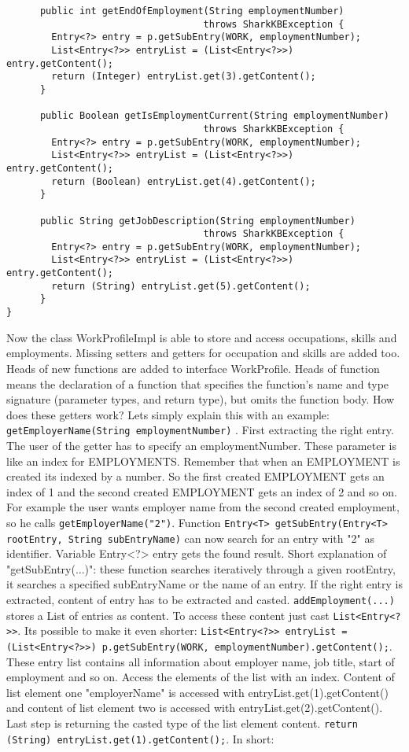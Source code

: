 \documentclass[12pt]{article}
\begin{document}
\begin{verbatim}
      public int getEndOfEmployment(String employmentNumber) 
                                   throws SharkKBException {
        Entry<?> entry = p.getSubEntry(WORK, employmentNumber);
        List<Entry<?>> entryList = (List<Entry<?>>) entry.getContent();
        return (Integer) entryList.get(3).getContent();
      }

      public Boolean getIsEmploymentCurrent(String employmentNumber) 
                                   throws SharkKBException {
        Entry<?> entry = p.getSubEntry(WORK, employmentNumber);
        List<Entry<?>> entryList = (List<Entry<?>>) entry.getContent();
        return (Boolean) entryList.get(4).getContent();
      }

      public String getJobDescription(String employmentNumber) 
                                   throws SharkKBException {
        Entry<?> entry = p.getSubEntry(WORK, employmentNumber);
        List<Entry<?>> entryList = (List<Entry<?>>) entry.getContent();
        return (String) entryList.get(5).getContent();
      }
}

\end{verbatim}
 
Now the class WorkProfileImpl is able to store and access occupations, skills and employments. Missing setters and getters for occupation and skills are added too. Heads of new functions are added to interface WorkProfile. Heads of function means  the declaration of a function that specifies the function's name and type signature (parameter types, and return type), but omits the function body. How does these getters work? Lets simply explain this with an example: {\tt getEmployerName(String employmentNumber)} . First extracting the right entry. The user of the getter has to specify an employmentNumber. These parameter is like an index for EMPLOYMENTS. Remember that when an EMPLOYMENT is created its indexed by a number. So the first created EMPLOYMENT gets an index of 1 and the second created EMPLOYMENT gets an index of 2 and so on. For example the user wants employer name from the second created employment, so he calls {\tt getEmployerName("2")}. Function {\tt Entry<T> getSubEntry(Entry<T> rootEntry, String subEntryName)} can now search for an entry with "2" as identifier. Variable Entry<?> entry gets the found result. Short explanation of "getSubEntry(...)": these function searches iteratively through a given rootEntry, it searches a specified subEntryName or the name of an entry. If the right entry is extracted, content of entry has to be extracted and casted. {\tt addEmployment(...)} stores a List of entries as content. To access these content just cast {\tt List<Entry<?>>}. Its possible to make it even shorter: {\tt List<Entry<?>> entryList = (List<Entry<?>>) p.getSubEntry(WORK, employmentNumber).getContent();}. These entry list contains all information about employer name, job title, start of employment and so on. Access the elements of the list with an index. Content of list element one "employerName" is accessed with entryList.get(1).getContent() and content of list element two is accessed with entryList.get(2).getContent(). Last step is returning the casted type of the list element content. {\tt return (String) entryList.get(1).getContent();}. In short:
\end{document}

